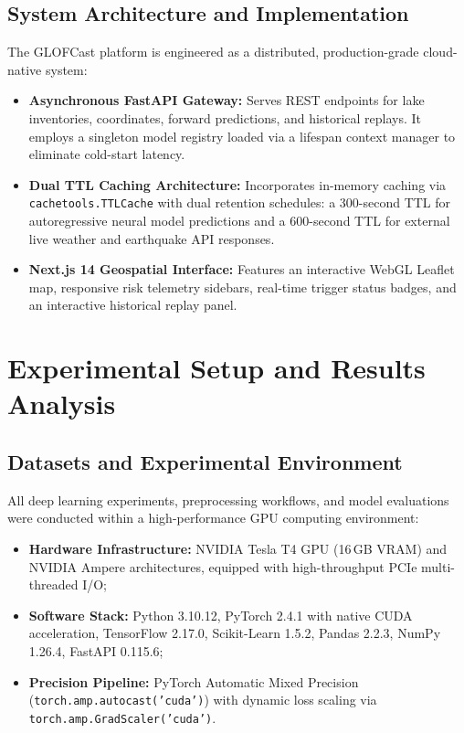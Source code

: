 \documentclass{mnnit}
\begin{document}
\section{System Architecture and Implementation}
The GLOFCast platform is engineered as a distributed, production-grade cloud-native system:
\begin{itemize}
    \item \textbf{Asynchronous FastAPI Gateway:} Serves REST endpoints for lake inventories, coordinates, forward predictions, and historical replays. It employs a singleton model registry loaded via a lifespan context manager to eliminate cold-start latency.
    \item \textbf{Dual TTL Caching Architecture:} Incorporates in-memory caching via \texttt{cachetools.TTLCache} with dual retention schedules: a 300-second TTL for autoregressive neural model predictions and a 600-second TTL for external live weather and earthquake API responses.
    \item \textbf{Next.js 14 Geospatial Interface:} Features an interactive WebGL Leaflet map, responsive risk telemetry sidebars, real-time trigger status badges, and an interactive historical replay panel.
\end{itemize}


\chapter{Experimental Setup and Results Analysis}

\section{Datasets and Experimental Environment}
All deep learning experiments, preprocessing workflows, and model evaluations were conducted within a high-performance GPU computing environment:
\begin{itemize}
    \item \textbf{Hardware Infrastructure:} NVIDIA Tesla T4 GPU (16\,GB VRAM) and NVIDIA Ampere architectures, equipped with high-throughput PCIe multi-threaded I/O;
    \item \textbf{Software Stack:} Python 3.10.12, PyTorch 2.4.1 with native CUDA acceleration, TensorFlow 2.17.0, Scikit-Learn 1.5.2, Pandas 2.2.3, NumPy 1.26.4, FastAPI 0.115.6;
    \item \textbf{Precision Pipeline:} PyTorch Automatic Mixed Precision (\texttt{torch.amp.autocast('cuda')}) with dynamic loss scaling via \texttt{torch.amp.GradScaler('cuda')}.
\end{itemize}
\end{document}
